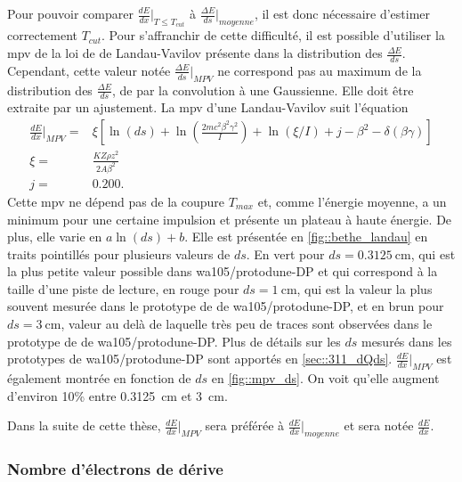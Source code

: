         Pour pouvoir comparer $\frac{dE}{dx}\rvert_{T\leq T_{cut}}$ à $\frac{\Delta E}{ds}\rvert_{moyenne}$, il est donc nécessaire d'estimer correctement $T_{cut}$. Pour s'affranchir de cette difficulté, il est possible d'utiliser la \gls{mpv} de la loi de de Landau-Vavilov présente dans la distribution des $\frac{\Delta E}{ds}$. Cependant, cette valeur notée $\frac{\Delta E}{ds}\rvert_{MPV}$ ne correspond pas au maximum de la distribution des $\frac{\Delta E}{ds}$, de par la convolution à une Gaussienne. Elle doit être extraite par un ajustement. La \gls{mpv} d'une Landau-Vavilov suit l'équation\cite{pdg2018}
        \begin{eqnarray}
          \frac{dE}{dx}\biggr\rvert_{MPV} = & \xi\left[\ln(ds) + \ln\left(\frac{2mc^2\beta^2\gamma^2}{I}\right)+\ln(\xi/I)+j-\beta^2 - \delta(\beta\gamma)\right] \label{eq::mpv} \\
          \xi = & \frac{KZ\rho z^2}{2A\beta^2}\nonumber\\
          j = & 0.200.\nonumber
        \end{eqnarray}
        Cette \gls{mpv} ne dépend pas de la coupure $T_{max}$ et, comme l'énergie moyenne, a un minimum pour une certaine impulsion et présente un plateau à haute énergie. De plus, elle varie en $a\ln(ds)+b$. Elle est présentée en \autoref{fig::bethe_landau} en traits pointillés pour plusieurs valeurs de $ds$. En vert pour $ds=\SI{0.3125}{\centi\meter}$, qui est la plus petite valeur possible dans \gls{wa105}/proto\gls{dune}-DP et qui correspond à la taille d'une piste de lecture, en rouge pour $ds=\SI{1}{\centi\meter}$, qui est la valeur la plus souvent mesurée dans le prototype de \TOO de \gls{wa105}/proto\gls{dune}-DP, et en brun pour $ds=\SI{3}{\centi\meter}$, valeur au delà de laquelle très peu de traces sont observées dans le prototype de \TOO de \gls{wa105}/proto\gls{dune}-DP. Plus de détails sur les $ds$ mesurés dans les prototypes de \gls{wa105}/proto\gls{dune}-DP sont apportés en \autoref{sec::311_dQds}. $\frac{dE}{dx}\rvert_{MPV}$ est également montrée en fonction de $ds$ en \autoref{fig::mpv_ds}. On voit qu'elle augment d'environ 10\;\% entre \SI{0.3125}{\centi\meter} et \SI{3}{\centi\meter}.

        Dans la suite de cette thèse, $\frac{dE}{dx}\rvert_{MPV}$ sera préférée à $\frac{dE}{dx}\rvert_{moyenne}$ et sera notée $\frac{dE}{dx}$.

      \subsubsection{Nombre d'électrons de dérive}

